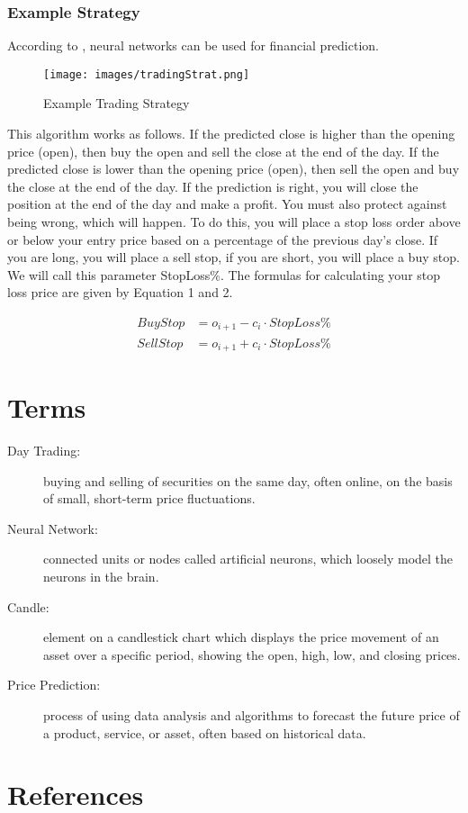 \documentclass{article}
\begin{document}
\subsubsection{Example Strategy}
According to \cite{zirilli2023}, neural networks can be used for financial prediction.
\begin{figure}[h]
    \centering
    \texttt{[image: images/tradingStrat.png]}
    \caption{Example Trading Strategy}
\end{figure}
This algorithm works as follows. If the predicted close is higher than the
opening price (open), then buy the open and sell the close at the end of the day. If the predicted close is lower than the opening price (open), then sell the open and buy the close at the end of the day. If the prediction is right, you will close the position at the end of the day and make a profit. You must also protect against being wrong, which will happen. To do this, you will place a stop loss order above or below your entry price based on a percentage of the previous day’s close. If you are long, you will place a sell stop, if you are short, you will place a buy stop. We will call this parameter StopLoss\%. The formulas for calculating your stop loss price are given by Equation 1 and 2.

\begin{align}
    BuyStop &= o_{i+1} - c_i \cdot StopLoss\% \\
    SellStop &= o_{i+1} + c_i \cdot StopLoss\%
\end{align}

\section{Terms}
\begin{description}
    \item[Day Trading:] buying and selling of securities on the same day, often online, on the basis of small, short-term price fluctuations.
    \item[Neural Network:] connected units or nodes called artificial neurons, which loosely model the neurons in the brain.
    \item[Candle:] element on a candlestick chart which displays the price movement of an asset over a specific period, showing the open, high, low, and closing prices.
    \item[Price Prediction:] process of using data analysis and algorithms to forecast the future price of a product, service, or asset, often based on historical data.
\end{description}

\section{References}
\printbibliography
\end{document}
